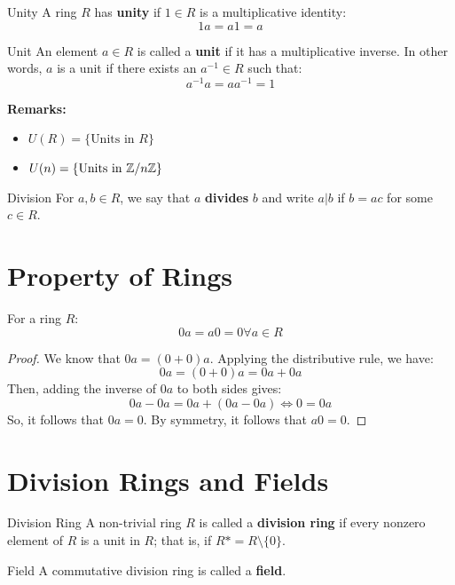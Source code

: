 \documentclass[letterpaper]{article}
\begin{document}
\begin{definition}{Unity}{}
    A ring $R$ has \textbf{unity} if $1 \in R$ is a multiplicative identity: 
    \[1a = a1 = a\]
\end{definition}

\begin{definition}{Unit}{}
    An element $a \in R$ is called a \textbf{unit} if it has a multiplicative inverse. In other words, $a$ is a unit if there exists an $a^{-1} \in R$ such that: 
    \[a^{-1}a = aa^{-1} = 1\]
\end{definition}
\textbf{Remarks:}
\begin{itemize}
    \item $U(R) = \{\text{Units in } R\}$
    \item $U(n) = \{\text{Units in } \mathbb{Z} / n\mathbb{Z}\}$
\end{itemize}

\begin{definition}{Division}{}
    For $a, b \in R$, we say that $a$ \textbf{divides} $b$ and write $a | b$ if $b = ac$ for some $c \in R$.
\end{definition}


\section{Property of Rings}
\begin{theorem}{}{}
    For a ring $R$:
    \[0a = a0 = 0 \forall a \in R\]
\end{theorem}

\begin{mdframed}[]
    \begin{proof}
        We know that $0a = (0 + 0)a$. Applying the distributive rule, we have: 
        \[0a = (0 + 0)a = 0a + 0a\]
        Then, adding the inverse of $0a$ to both sides gives: 
        \[0a - 0a = 0a + (0a - 0a) \iff 0 = 0a\]
        So, it follows that $0a = 0$. By symmetry, it follows that $a0 = 0$. 
    \end{proof}
\end{mdframed}

\section{Division Rings and Fields}
\begin{definition}{Division Ring}{}
    A non-trivial ring $R$ is called a \textbf{division ring} if every nonzero element of $R$ is a unit in $R$; that is, if $R* = R \setminus \{0\}$. 
\end{definition}

\begin{definition}{Field}{}
    A commutative division ring is called a \textbf{field}.
\end{definition}
\end{document}
